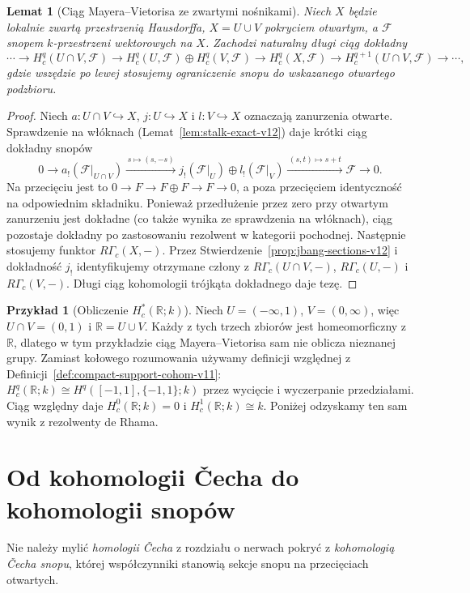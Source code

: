 \documentclass[11pt,a4paper,oneside]{report}
\newcommand{\R}{\mathbb{R}}
\theoremstyle{plain}
\newtheorem{lemat}[twierdzenie]{Lemat}
\theoremstyle{definition}
\newtheorem{przyklad}[twierdzenie]{Przykład}
\theoremstyle{remark}
\begin{document}
\begin{lemat}[Ciąg Mayera--Vietorisa ze zwartymi nośnikami]
\label{lem:sheaf-mv-v12}
Niech $X$ będzie lokalnie zwartą przestrzenią Hausdorffa,
$X=U\cup V$ pokryciem otwartym, a $\mathcal F$ snopem
$k$-przestrzeni wektorowych na $X$. Zachodzi naturalny
długi ciąg dokładny
\[
\cdots\longrightarrow H_c^q(U\cap V,\mathcal F)
\longrightarrow H_c^q(U,\mathcal F)\oplus H_c^q(V,\mathcal F)
\longrightarrow H_c^q(X,\mathcal F)
\longrightarrow H_c^{q+1}(U\cap V,\mathcal F)\longrightarrow\cdots,
\]
gdzie wszędzie po lewej stosujemy ograniczenie snopu do
wskazanego otwartego podzbioru.
\end{lemat}
\begin{proof}
Niech $a:U\cap V\hookrightarrow X$, $j:U\hookrightarrow X$
i $l:V\hookrightarrow X$ oznaczają zanurzenia otwarte.
Sprawdzenie na włóknach (Lemat~\ref{lem:stalk-exact-v12}) daje krótki
ciąg dokładny snopów
\[
0\longrightarrow a_!(\mathcal F|_{U\cap V})
\xrightarrow{\,s\mapsto(s,-s)\,}
 j_!(\mathcal F|_U)\oplus l_!(\mathcal F|_V)
\xrightarrow{\,(s,t)\mapsto s+t\,}\mathcal F\longrightarrow0.
\]
Na przecięciu jest to $0\to F\to F\oplus F\to F\to0$,
a poza przecięciem identyczność na odpowiednim składniku.
Ponieważ przedłużenie przez zero przy otwartym zanurzeniu
jest dokładne (co także wynika ze sprawdzenia na włóknach),
ciąg pozostaje dokładny po zastosowaniu rezolwent w kategorii
pochodnej. Następnie stosujemy funktor $R\Gamma_c(X,-)$.
Przez Stwierdzenie~\ref{prop:jbang-sections-v12} i dokładność
$j_!$ identyfikujemy otrzymane człony z
$R\Gamma_c(U\cap V,-)$, $R\Gamma_c(U,-)$ i $R\Gamma_c(V,-)$.
Długi ciąg kohomologii trójkąta dokładnego daje tezę.
\end{proof}

\begin{przyklad}[Obliczenie $H_c^*(\R;k)$]
Niech $U=(-\infty,1)$, $V=(0,\infty)$, więc $U\cap V=(0,1)$
i $\R=U\cup V$. Każdy z tych trzech zbiorów jest homeomorficzny
z $\R$, dlatego w tym przykładzie ciąg Mayera--Vietorisa
sam nie oblicza nieznanej grupy. Zamiast kołowego rozumowania
używamy definicji względnej z
Definicji~\ref{def:compact-support-cohom-v11}:
$H_c^q(\R;k)\cong H^q([-1,1],\{-1,1\};k)$
przez wycięcie i wyczerpanie przedziałami. Ciąg względny daje
$H_c^0(\R;k)=0$ i $H_c^1(\R;k)\cong k$.
Poniżej odzyskamy ten sam wynik z rezolwenty de Rhama.
\end{przyklad}

\section{Od kohomologii \v{C}echa do kohomologii snopów}
\label{sec:cech-sheaves-v12}
Nie należy mylić \emph{homologii \v{C}echa} z rozdziału o
nerwach pokryć z \emph{kohomologią \v{C}echa snopu}, której
współczynniki stanowią sekcje snopu na przecięciach otwartych.
\end{document}
